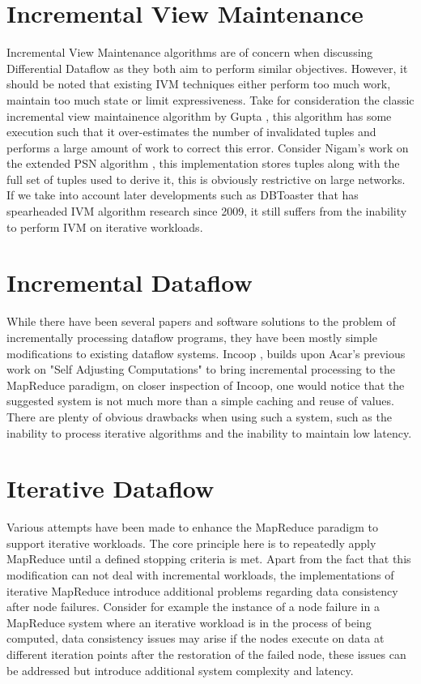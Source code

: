 \section{Incremental View Maintenance}
Incremental View Maintenance algorithms are of concern when discussing Differential Dataflow as they both aim to perform similar objectives. However, it should be noted that existing IVM techniques either perform too much work, maintain too much state or limit expressiveness. Take for consideration the classic incremental view maintainence algorithm by Gupta \cite{gupta1993maintaining}, this algorithm has some execution such that it over-estimates the number of invalidated tuples and performs a large amount of work to correct this error. Consider Nigam's work on the extended PSN algorithm \cite{nigam2012maintaining}, this implementation stores tuples along with the full set of tuples used to derive it, this is obviously restrictive on large networks. If we take into account later developments such as DBToaster \cite{ahmad2012dbtoaster} that has spearheaded IVM algorithm research since 2009, it still suffers from the inability to perform IVM on iterative workloads. 

\section{Incremental Dataflow}
While there have been several papers and software solutions to the problem of incrementally processing dataflow programs, they have been mostly simple modifications to existing dataflow systems. Incoop \cite{bhatotia2011incoop}, builds upon Acar's previous work on "Self Adjusting Computations" \cite{acar2005self} to bring incremental processing to the MapReduce paradigm, on closer inspection of Incoop, one would notice that the suggested system is not much more than a simple caching and reuse of values. There are plenty of obvious drawbacks when using such a system, such as the inability to process iterative algorithms and the inability to maintain low latency. 

\section{Iterative Dataflow}
Various attempts have been made to enhance the MapReduce \cite{dean2004mapreduce} paradigm to support iterative workloads. The core principle here is to repeatedly apply MapReduce until a defined stopping criteria is met. Apart from the fact that this modification can not deal with incremental workloads, the implementations of iterative MapReduce introduce additional problems regarding data consistency after node failures. Consider for example the instance of a node failure in a MapReduce system where an iterative workload is in the process of being computed, data consistency issues may arise if the nodes execute on data at different iteration points after the restoration of the failed node, these issues can be addressed but introduce additional system complexity and latency. 


